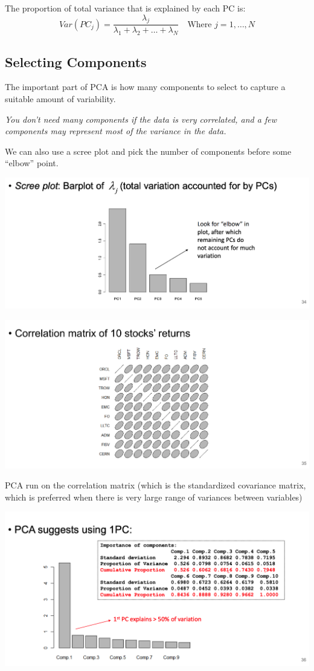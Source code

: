 \documentclass[
  oneside]{book}
\begin{document}
The proportion of total variance that is explained by each PC is:
\[
Var(PC_{j}) =\frac{\lambda_{j}}{\lambda_{1}+\lambda_{2}+\dots+\lambda_{N}} \quad \text{Where } j=1,\dots,N
\]

\hypertarget{selecting-components}{%
\subsection{Selecting Components}\label{selecting-components}}

The important part of PCA is how many components to select to capture a suitable amount of variability.

\emph{You don't need many components if the data is very correlated, and a few components may represent most of the variance in the data.}

We can also use a scree plot and pick the number of components before some ``elbow'' point.

\includegraphics{Notes/Obsidian-Attachments/5-Factor-Models-1.png}

\includegraphics{Notes/Obsidian-Attachments/5-Factor-Models-2.png}

PCA run on the correlation matrix (which is the standardized covariance matrix, which is preferred when there is very large range of variances between variables)

\includegraphics{Notes/Obsidian-Attachments/5-Factor-Models-3.png}
\end{document}
